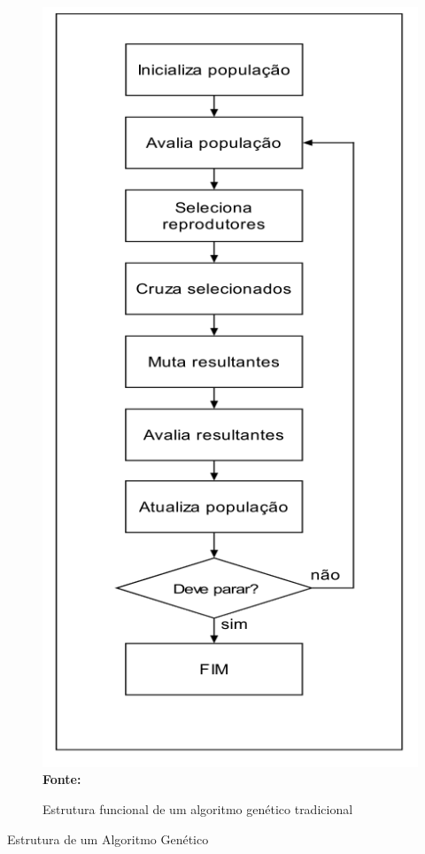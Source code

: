 \documentclass{abntpuc}
\begin{document}
\begin{figure}[!htb]
\caption[Estrutura funcional de um algoritmo genético tradicional]{Estrutura funcional de um algoritmo genético tradicional}
\label{fig:ag}
\centering
\includegraphics[scale=0.62]{imagens/ag.png}
\\ \textbf{\footnotesize Fonte: \cite{lucas2000algoritmos}}
\end{figure}

 Estrutura de um Algoritmo Genético 
 
\end{document}
